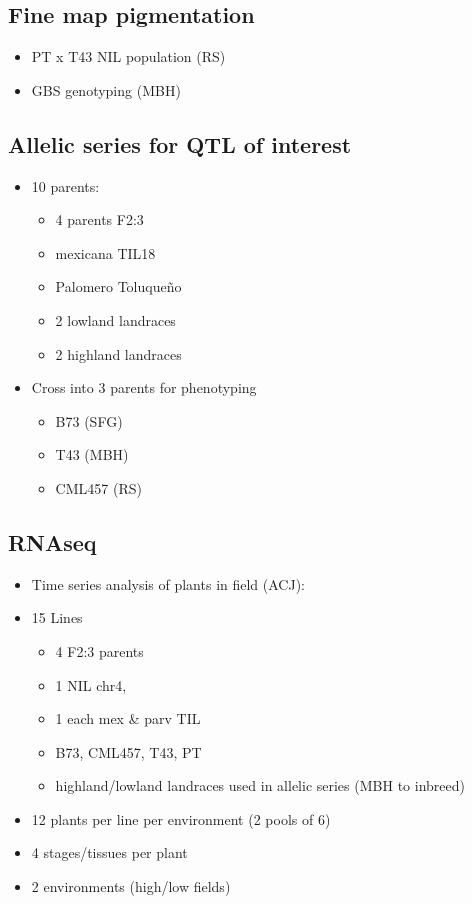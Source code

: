 \subsection{Fine map pigmentation} \label{subsec:pigment}
\begin{itemize}
\item PT x T43 NIL population (RS)
\item GBS genotyping (MBH)
\end{itemize}

\subsection{Allelic series for QTL of interest} \label{subsec:series}
\begin{itemize}
\item 10 parents:
\begin{itemize}
\item 4 parents F2:3
\item mexicana TIL18
\item Palomero Toluqueño
\item 2 lowland landraces
\item 2 highland landraces
\end{itemize}
\item Cross into 3 parents for phenotyping
\begin{itemize}
\item B73 (SFG)
\item T43 (MBH)
\item CML457 (RS)
\end{itemize}
\end{itemize}

\subsection{RNAseq} \label{subsec:rnaseq}
\begin{itemize}
\item Time series analysis of plants in field (ACJ):
\item 15 Lines
\begin{itemize}
\item 4 F2:3 parents
\item 1 NIL chr4,
\item 1 each mex \& parv TIL
\item B73, CML457, T43, PT
\item highland/lowland landraces used in allelic series (MBH to inbreed)
\end{itemize}
\item 12 plants per line per environment (2 pools of 6)
\item 4 stages/tissues per plant
\item 2 environments (high/low fields)
\end{itemize}

